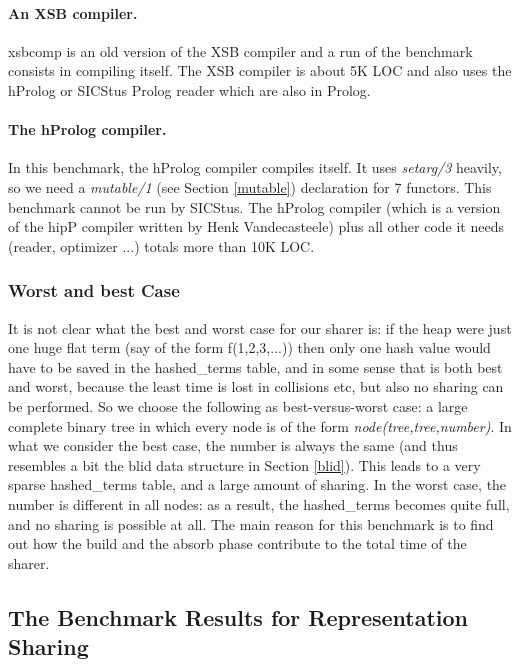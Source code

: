 \documentclass{tlp}
\begin{document}
\paragraph{An XSB compiler.}

xsbcomp is an old version of the XSB compiler \cite{SaSW94} and a run
of the benchmark consists in compiling itself. The XSB compiler is
about 5K LOC and also uses the hProlog or SICStus Prolog reader which
are also in Prolog.



\paragraph{The hProlog compiler.}

In this benchmark, the hProlog compiler compiles itself. It uses {\em
setarg/3} heavily, so we need a {\em mutable/1} (see Section
\ref{mutable}) declaration for 7 functors. This benchmark cannot be
run by SICStus. The hProlog compiler (which is a version of the hipP
compiler \cite{querypacks} written by Henk Vandecasteele) plus all
other code it needs (reader, optimizer ...) totals more than 10K LOC.



\subsubsection{Worst and best Case}

It is not clear what the best and worst case for our sharer is: if the
heap were just one huge flat term (say of the form f(1,2,3,...)) then
only one hash value would have to be saved in the hashed\_terms table,
and in some sense that is both best and worst, because the least time
is lost in collisions etc, but also no sharing can be performed. So we
choose the following as best-versus-worst case: a large complete
binary tree in which every node is of the form {\em
node(tree,tree,number)}. In what we consider the best case, the number
is always the same (and thus resembles a bit the blid data structure
in Section \ref{blid}). This leads to a very sparse hashed\_terms
table, and a large amount of sharing. In the worst case, the number is
different in all nodes: as a result, the hashed\_terms becomes quite
full, and no sharing is possible at all. The main reason for this
benchmark is to find out how the build and the absorb phase contribute
to the total time of the sharer.

\subsection{The Benchmark Results for Representation Sharing}
\end{document}
